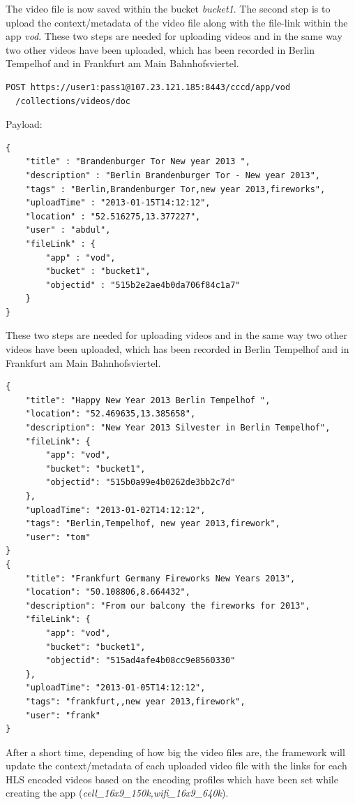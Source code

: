 The video file is now saved within the bucket \textit{bucket1}. The second step is to upload the context/metadata of the video file along with the file-link within the app \textit{vod}. These two steps are needed for uploading videos and in the same way two other videos have been uploaded, which has been recorded in Berlin Tempelhof and in Frankfurt am Main Bahnhofsviertel. 
\begin{code}
\begin{verbatim}
POST https://user1:pass1@107.23.121.185:8443/cccd/app/vod
  /collections/videos/doc
\end{verbatim}
Payload:
\begin{verbatim}
{
	"title" : "Brandenburger Tor New year 2013 ",
	"description" : "Berlin Brandenburger Tor - New year 2013",
	"tags" : "Berlin,Brandenburger Tor,new year 2013,fireworks",
	"uploadTime" : "2013-01-15T14:12:12",
	"location" : "52.516275,13.377227",
	"user" : "abdul",
	"fileLink" : {
		"app" : "vod",
		"bucket" : "bucket1", 
		"objectid" : "515b2e2ae4b0da706f84c1a7"
	}
}
\end{verbatim}
\end{code}

These two steps are needed for uploading videos and in the same way two other videos have been uploaded, which has been recorded in Berlin Tempelhof and in Frankfurt am Main Bahnhofsviertel. 
\begin{code}
\begin{verbatim}
{
	"title": "Happy New Year 2013 Berlin Tempelhof ",
	"location": "52.469635,13.385658",
	"description": "New Year 2013 Silvester in Berlin Tempelhof",
	"fileLink": {
		"app": "vod",
		"bucket": "bucket1",
		"objectid": "515b0a99e4b0262de3bb2c7d"
	},
	"uploadTime": "2013-01-02T14:12:12",
	"tags": "Berlin,Tempelhof, new year 2013,firework",
	"user": "tom"
}
{
	"title": "Frankfurt Germany Fireworks New Years 2013",
	"location": "50.108806,8.664432",
	"description": "From our balcony the fireworks for 2013",
	"fileLink": {
		"app": "vod",
		"bucket": "bucket1",
		"objectid": "515ad4afe4b08cc9e8560330"
	},
	"uploadTime": "2013-01-05T14:12:12",
	"tags": "frankfurt,,new year 2013,firework",
	"user": "frank"
}
\end{verbatim}
\end{code}

After a short time, depending of how big the video files are, the framework will update the context/metadata of each uploaded video file with the links for each \ac{HLS} encoded videos based on the encoding profiles which have been set while creating the app (\textit{cell\_16x9\_150k,wifi\_16x9\_640k}).

